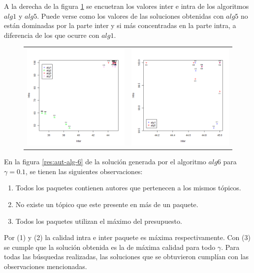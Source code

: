 A la derecha de la figura \ref{res:aut_alg1_vs_alg5_vs_alg7} se encuetran los valores inter e intra de los algoritmos $alg1$ y $alg5$. Puede verse como los valores de las soluciones obtenidas con $alg5$ no están dominadas por la parte inter y si más concentradas en la parte intra, a diferencia de los que ocurre con $alg1$.

\begin{figure}[H]
	\centering
	\begin{tabular}{cc}
			\includegraphics[width=0.5\linewidth]{img/aut-alg1-alg2-alg5-alg7.png}&
			\includegraphics[width=0.5\linewidth]{img/aut-alg1-alg5.png}\\
	\end{tabular}
	\caption{}
	\label{res:aut_alg1_vs_alg5_vs_alg7}
\end{figure}


En la figura \ref{res:aut-alg-6} de la solución generada por el algoritmo $alg6$ para $\gamma = 0.1$, se tienen las siguientes observaciones:
\begin{enumerate}
	\item Todos los paquetes contienen autores que pertenecen a los mismos tópicos. 
	\item No existe un tópico que este presente en más de un paquete.
	\item Todos los paquetes utilizan el máximo del presupuesto.
\end{enumerate}
Por (1) y (2) la calidad intra e inter paquete es máxima respectivamente. Con (3) se cumple que la solución obtenida es la de máxima calidad para todo $\gamma$. Para todas las búsquedas realizadas, las soluciones que se obtuvieron cumplían con las observaciones mencionadas.

